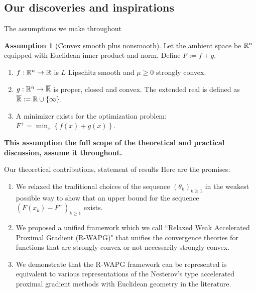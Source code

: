 \documentclass[11pt]{beamer}
\theoremstyle{definition}
\newtheorem{assumption}{Assumption}[section]
\begin{document}
    \subsection{Our discoveries and inspirations}
        \begin{frame}{The assumptions we make throughout}
            \begin{assumption}[Convex smooth plus nonsmooth]
                Let the ambient space be $\mathbb R^n$ equipped with Euclidean inner product and norm. 
                Define $F := f + g$.
                \begin{enumerate}
                    \item $f: \mathbb R^n \rightarrow \mathbb R$ is $L$ Lipschitz smooth and $\mu \ge 0$ strongly convex.
                    \item $g: \mathbb R^n \rightarrow \overline {\mathbb R}$ is proper, closed and convex. The extended real is defined as $\overline {\mathbb R} := \mathbb R \cup \{\infty\}$.
                    \item A minimizer exists for the optimization problem: $F^+ = \min_x \left\lbrace f(x) + g(x)\right\rbrace$.
                \end{enumerate}
            \end{assumption}
            \textbf{This assumption the full scope of the theoretical and practical discussion, assume it throughout.}
        \end{frame}
        \begin{frame}{Our theoretical contributions, statement of results}
            Here are the promises: 
            \begin{enumerate}
                \item We relaxed the traditional choices of the sequence $(\theta_k)_{k \ge 1}$ in the weakest possible way to show that an upper bound for the sequence $(F(x_k) - F^+)_{k \ge 1}$ exists. 
                \item We proposed a unified framework which we call ``Relaxed Weak Accelerated Proximal Gradient (R-WAPG)" that unifies the convergence theories for functions that are strongly convex or not necessarily strongly convex. 
                \item We demonstrate that the R-WAPG framework can be represented is equivalent to various representations of the Nesterov's type accelerated proximal gradient methods with Euclidean geometry in the literature. 
            \end{enumerate}
             
        \end{frame}
\end{document}
